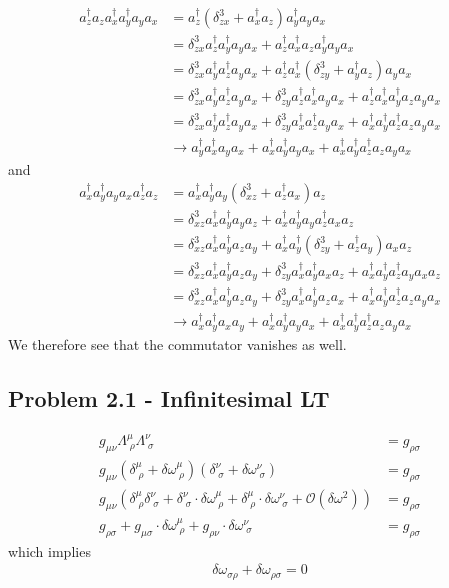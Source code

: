 \documentclass[../main.tex]{subfiles}
\begin{document}
\begin{align}
a^\dagger_za_za^\dagger_xa^\dagger_ya_ya_x
&=a^\dagger_z(\delta^3_{zx}+a^\dagger_xa_z)a^\dagger_ya_ya_x\\
&=\delta^3_{zx}a^\dagger_za^\dagger_ya_ya_x+a^\dagger_za^\dagger_xa_za^\dagger_ya_ya_x\\
&=\delta^3_{zx}a^\dagger_ya^\dagger_za_ya_x+a^\dagger_za^\dagger_x(\delta^3_{zy}+a^\dagger_ya_z)a_ya_x\\
&=\delta^3_{zx}a^\dagger_ya^\dagger_za_ya_x+\delta^3_{zy}a^\dagger_za^\dagger_xa_ya_x+a^\dagger_za^\dagger_xa^\dagger_ya_za_ya_x\\
&=\delta^3_{zx}a^\dagger_ya^\dagger_za_ya_x+\delta^3_{zy}a^\dagger_xa^\dagger_za_ya_x+a^\dagger_xa^\dagger_ya^\dagger_za_za_ya_x\\
&\rightarrow a^\dagger_ya^\dagger_xa_ya_x+a^\dagger_xa^\dagger_ya_ya_x+a^\dagger_xa^\dagger_ya^\dagger_za_za_ya_x
\end{align}
and
\begin{align}
a^\dagger_xa^\dagger_ya_ya_xa^\dagger_za_z
&=a^\dagger_xa^\dagger_ya_y(\delta^3_{xz}+a^\dagger_za_x)a_z\\
&=\delta^3_{xz}a^\dagger_xa^\dagger_ya_ya_z+a^\dagger_xa^\dagger_ya_ya^\dagger_za_xa_z\\
&=\delta^3_{xz}a^\dagger_xa^\dagger_ya_za_y+a^\dagger_xa^\dagger_y(\delta^3_{zy}+a^\dagger_za_y)a_xa_z\\
&=\delta^3_{xz}a^\dagger_xa^\dagger_ya_za_y+\delta^3_{zy}a^\dagger_xa^\dagger_ya_xa_z+a^\dagger_xa^\dagger_ya^\dagger_za_ya_xa_z\\
&=\delta^3_{xz}a^\dagger_xa^\dagger_ya_za_y+\delta^3_{zy}a^\dagger_xa^\dagger_ya_za_x+a^\dagger_xa^\dagger_ya^\dagger_za_za_ya_x\\
&\rightarrow a^\dagger_xa^\dagger_ya_xa_y+a^\dagger_xa^\dagger_ya_ya_x+a^\dagger_xa^\dagger_ya^\dagger_za_za_ya_x
\end{align}
We therefore see that the commutator vanishes as well.

\subsection{Problem 2.1 - Infinitesimal LT}
\begin{align}
g_{\mu\nu}\Lambda^\mu_{\;\rho}\Lambda^\nu_{\;\sigma}&=g_{\rho\sigma}\\
g_{\mu\nu}\left(\delta^\mu_{\;\rho}+\delta\omega^\mu_{\;\rho}\right)\left(\delta^\nu_{\;\sigma}+\delta\omega^\nu_{\;\sigma}\right)&=g_{\rho\sigma}\\
g_{\mu\nu}\left(\delta^\mu_{\;\rho}\delta^\nu_{\;\sigma}+\delta^\nu_{\;\sigma}\cdot\delta\omega^\mu_{\;\rho}+\delta^\mu_{\;\rho}\cdot\delta\omega^\nu_{\;\sigma}+\mathcal{O}(\delta\omega^2)\right)&=g_{\rho\sigma}\\
g_{\rho\sigma}+g_{\mu\sigma}\cdot\delta\omega^\mu_{\;\rho}+g_{\rho\nu}\cdot\delta\omega^\nu_{\;\sigma}&=g_{\rho\sigma}
\end{align}
which implies
\begin{align}
\delta\omega_{\sigma\rho}+\delta\omega_{\rho\sigma}=0
\end{align}
\end{document}

